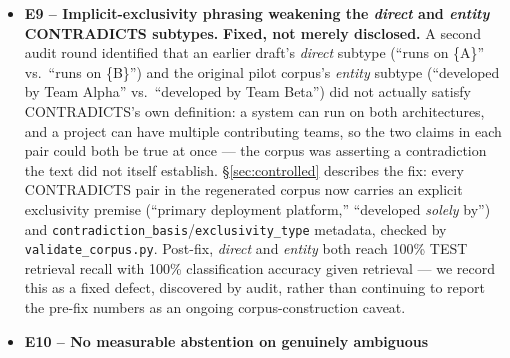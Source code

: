 \begin{itemize}
    frequently misclassified CONTRADICTS. On the sanitized corpus's
    frozen TEST split (17 purpose-built multi-attribute pairs), all 17
    are retrieved (100\%, confirming the relatedness gate correctly
    recognizes these as topically related --- that is its entire job),
    and only 5 of 17 (29.4\%) are correctly labeled NEUTRAL; the other 12
    are all misclassified CONTRADICTS. (An earlier draft of this entry
    reported ``zero are correctly labeled NEUTRAL''; the frozen results
    artifact shows 5, not 0, and this entry is corrected accordingly ---
    the finding survives at a less extreme magnitude.) Neither the
    relatedness gate nor the NLI model reliably distinguishes ``two
    attributes describing the same entity'' from ``two mutually exclusive
    claims about the same entity''; ``X uses A'' and ``X uses B'' most
    often read as a factual disagreement about which is true, when both
    can be. This is this corpus's most consequential open item for
    future resolver work, and it survives corpus sanitation unchanged in
    kind --- it is a genuine resolver/gate gap, not a symptom of the
    grammar or exclusivity defects fixed elsewhere in this corpus.
  \item \textbf{E9 -- Implicit-exclusivity phrasing weakening the
    \emph{direct} and \emph{entity} CONTRADICTS subtypes.} \textbf{Fixed,
    not merely disclosed.} A second audit round identified that an
    earlier draft's \emph{direct} subtype (``runs on \{A\}'' vs.\ ``runs
    on \{B\}'') and the original pilot corpus's \emph{entity} subtype
    (``developed by Team Alpha'' vs.\ ``developed by Team Beta'') did not
    actually satisfy CONTRADICTS's own definition: a system can run on
    both architectures, and a project can have multiple contributing
    teams, so the two claims in each pair could both be true at once ---
    the corpus was asserting a contradiction the text did not itself
    establish. \S\ref{sec:controlled} describes the fix: every CONTRADICTS
    pair in the regenerated corpus now carries an explicit exclusivity
    premise (``primary deployment platform,'' ``developed \emph{solely}
    by'') and \texttt{contradiction\_basis}/\texttt{exclusivity\_type}
    metadata, checked by \texttt{validate\_corpus.py}. Post-fix,
    \emph{direct} and \emph{entity} both reach 100\% TEST retrieval
    recall with 100\% classification accuracy given retrieval --- we
    record this as a fixed defect, discovered by audit, rather
    than continuing to report the pre-fix numbers as an ongoing
    corpus-construction caveat.
  \item \textbf{E10 -- No measurable abstention on genuinely ambiguous
}
\end{itemize}
